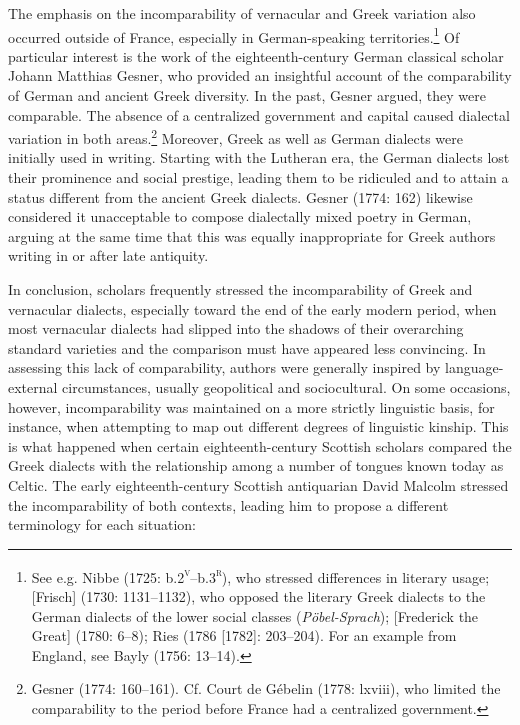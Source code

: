 \documentclass[12pt]{article}
\newenvironment{styleStandard}{\renewcommand\baselinestretch{1.25}\setlength\leftskip{0in}\setlength\rightskip{0in}\setlength\parindent{0.1972in}\setlength\parfillskip{0pt plus 1fil}\setlength\parskip{0in plus 1pt}\writerlistparindent\writerlistleftskip\leavevmode\normalfont\normalsize\writerlistlabel\ignorespaces}{\unskip\vspace{0in plus 1pt}\par}
\newcommand\writerlistleftskip{}
\newcommand\writerlistparindent{}
\newcommand\writerlistlabel{}
\begin{document}
\begin{styleStandard}
The emphasis on the incomparability of vernacular and Greek variation also occurred outside of France, especially in German-speaking territories.\footnote{ See e.g. Nibbe (1725: b.2\textsc{\textsuperscript{v}}\textsc{–}b.3\textsc{\textsuperscript{r}}), who stressed differences in literary usage; [Frisch] (1730: 1131–1132), who opposed the literary Greek dialects to the German dialects of the lower social classes (\textit{Pöbel-Sprach}); [Frederick the Great] (1780: 6–8); Ries (1786 [1782]: 203–204). For an example from England, see Bayly (1756: 13–14).} Of particular interest is the work of the eighteenth-century German classical scholar Johann Matthias Gesner, who provided an insightful account of the comparability of German and ancient Greek diversity. In the past, Gesner argued, they were comparable. The absence of a centralized government and capital caused dialectal variation in both areas.\footnote{ Gesner (1774: 160–161). Cf. Court de Gébelin (1778: lxviii), who limited the comparability to the period before France had a centralized government.} Moreover, Greek as well as German dialects were initially used in writing. Starting with the Lutheran era, the German dialects lost their prominence and social prestige, leading them to be ridiculed and to attain a status different from the ancient Greek dialects. Gesner (1774: 162) likewise considered it unacceptable to compose dialectally mixed poetry in German, arguing at the same time that this was equally inappropriate for Greek authors writing in or after late antiquity.
\end{styleStandard}

\begin{styleStandard}
In conclusion, scholars frequently stressed the incomparability of Greek and vernacular dialects, especially toward the end of the early modern period, when most vernacular dialects had slipped into the shadows of their overarching standard varieties and the comparison must have appeared less convincing. In assessing this lack of comparability, authors were generally inspired by language-external circumstances, usually geopolitical and sociocultural. On some occasions, however, incomparability was maintained on a more strictly linguistic basis, for instance, when attempting to map out different degrees of linguistic kinship. This is what happened when certain eighteenth-century Scottish scholars compared the Greek dialects with the relationship among a number of tongues known today as Celtic. The early eighteenth-century Scottish antiquarian David Malcolm stressed the incomparability of both contexts, leading him to propose a different terminology for each situation:
\end{styleStandard}
\end{document}
